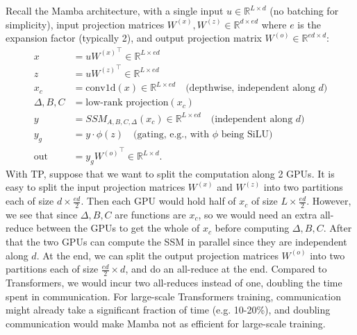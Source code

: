 \documentclass{article}
\begin{document}
Recall the Mamba architecture, with a single input $u \in \mathbb{R}^{L \times d}$ (no batching for simplicity), input projection matrices $W^{(x)}, W^{(z)} \in \mathbb{R}^{d \times ed}$ where $e$ is the expansion factor (typically 2), and output projection matrix $W^{(o)} \in \mathbb{R}^{ed \times d}$:
\begin{align*}
   x &= u {W^{(x)}}^\top \in \mathbb{R}^{L \times ed} \\
   z &= u {W^{(z)}}^\top \in \mathbb{R}^{L \times ed} \\
   x_c &= \mathrm{conv1d}(x) \in \mathbb{R}^{L \times ed} \quad \text{(depthwise, independent along $d$)} \\
   \Delta, B, C &= \text{low-rank projection}(x_c) \\
   y &= SSM_{A, B, C, \Delta}(x_c) \in \mathbb{R}^{L \times ed} \quad \text{(independent along $d$)} \\
   y_g &= y \cdot \phi(z)  \quad \text{(gating, e.g., with $\phi$ being SiLU)} \\
  \mathrm{out} &= y_g {W^{(o)}}^\top \in \mathbb{R}^{L \times d}.
\end{align*}
With TP, suppose that we want to split the computation along 2 GPUs. It is easy to split the input projection matrices $W^{(x)}$ and $W^{(z)}$ into two partitions each of size $d \times \frac{ed}{2}$.
Then each GPU would hold half of $x_c$ of size $L \times \frac{ed}{2}$.
However, we see that since $\Delta, B, C$ are functions are $x_c$, so we would need an extra all-reduce between the GPUs to get the whole of $x_c$ before computing $\Delta, B, C$.
After that the two GPUs can compute the SSM in parallel since they are independent along $d$.
At the end, we can split the output projection matrices $W^{(o)}$ into two partitions each of size $\frac{ed}{2} \times d$, and do an all-reduce at the end.
Compared to Transformers, we would incur two all-reduces instead of one, doubling the time spent in communication. For large-scale Transformers training, communication might already take a significant fraction of time (e.g. 10-20\%), and doubling communication would make Mamba not as efficient for large-scale training.
\end{document}
